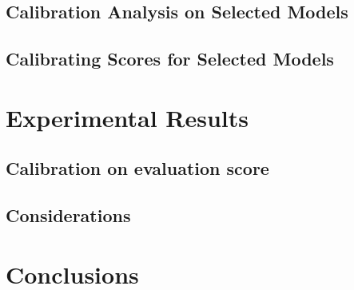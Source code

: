 \documentclass{article}
\begin{document}
\subsection{Calibration Analysis on Selected Models}
\subsection{Calibrating Scores for Selected Models}
\section{Experimental Results}
\subsection{Calibration on evaluation score}
\subsection{Considerations}
\section{Conclusions}


\newpage



\end{document}
